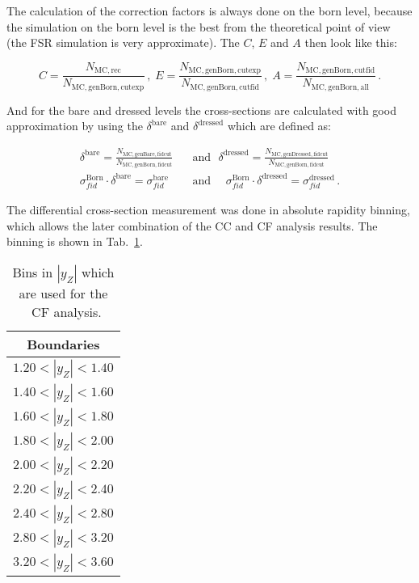 The calculation of the correction factors is always done on the born level, because the simulation on the born level is the best from the theoretical point of view (the FSR simulation is very approximate). The $C$, $E$ and $A$ then look like this:

\begin{equation}
C = \frac{N_\mathrm{MC, rec}}{N_\mathrm{MC, genBorn, cutexp}}\,, \;
E = \frac{N_\mathrm{MC, genBorn, cutexp}}{N_\mathrm{MC, genBorn, cutfid}}\,, \;
A = \frac{N_\mathrm{MC, genBorn, cutfid}}{N_\mathrm{MC, genBorn, all}}\,.
\end{equation}

And for the bare and dressed levels the cross-sections are calculated with good approximation by using the $\delta^\mathrm{bare}$ and $\delta^\mathrm{dressed}$ which are defined as:

\begin{equation}
\begin{split}
  \delta^\mathrm{bare} = \frac{N_\mathrm{MC, genBare, fidcut}}{N_\mathrm{MC, genBorn, fidcut}}\:\:\:&\mbox{and}\:\:\:
  \delta^\mathrm{dressed} = \frac{N_\mathrm{MC, genDressed, fidcut}}{N_\mathrm{MC, genBorn, fidcut}}\\
  \sigma_{fid}^\mathrm{Born} \cdot \delta^\mathrm{bare} =
  \sigma_{fid}^\mathrm{bare} \:\:\:\:\:\:&\mbox{and}\:\:\:\:\:\:
  \sigma_{fid}^\mathrm{Born} \cdot \delta^\mathrm{dressed} =
  \sigma_{fid}^\mathrm{dressed} \,.
\end{split}
\end{equation}


The differential cross-section measurement was done in absolute rapidity binning, which allows the later combination of the CC and CF analysis results. The binning is shown in Tab.~\ref{tab:ZeeCS_bins}.

\begin{table}
\centering
\begin{tabular}{c}
\hline\hline
Boundaries\\\hline
$1.20 < |y_{Z}| <1.40$\\
$1.40 < |y_{Z}| <1.60$\\
$1.60 < |y_{Z}| <1.80$\\
$1.80 < |y_{Z}| <2.00$\\
$2.00 < |y_{Z}| <2.20$\\
$2.20 < |y_{Z}| <2.40$\\
$2.40 < |y_{Z}| <2.80$\\
$2.80 < |y_{Z}| <3.20$\\
$3.20 < |y_{Z}| <3.60$\\
\hline\hline
\end{tabular}
\caption{Bins in $|y_{Z}|$ which are used for the \Zee\ CF analysis.}
\label{tab:ZeeCS_bins}
\end{table}
